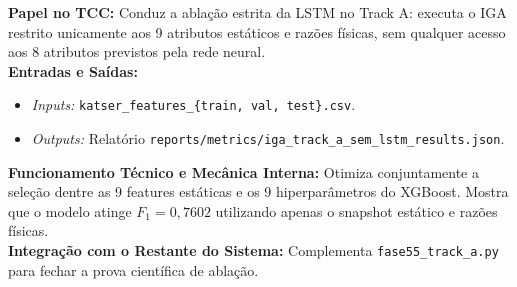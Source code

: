 \documentclass[10pt,a4paper]{article}
\begin{document}
\begin{filebox}
\textbf{Papel no TCC:} Conduz a ablação estrita da LSTM no Track A: executa o IGA restrito unicamente aos 9 atributos estáticos e razões físicas, sem qualquer acesso aos 8 atributos previstos pela rede neural.\\
\textbf{Entradas e Saídas:}
\begin{itemize}[leftmargin=*,itemsep=1pt]
  \item \textit{Inputs:} \texttt{katser\_features\_\{train, val, test\}.csv}.
  \item \textit{Outputs:} Relatório \texttt{reports/metrics/iga\_track\_a\_sem\_lstm\_results.json}.
\end{itemize}
\textbf{Funcionamento Técnico e Mecânica Interna:} Otimiza conjuntamente a seleção dentre as 9 features estáticas e os 9 hiperparâmetros do XGBoost. Mostra que o modelo atinge $F_1 = 0,7602$ utilizando apenas o snapshot estático e razões físicas.\\
\textbf{Integração com o Restante do Sistema:} Complementa \texttt{fase55\_track\_a.py} para fechar a prova científica de ablação.
\end{filebox}
\end{document}
